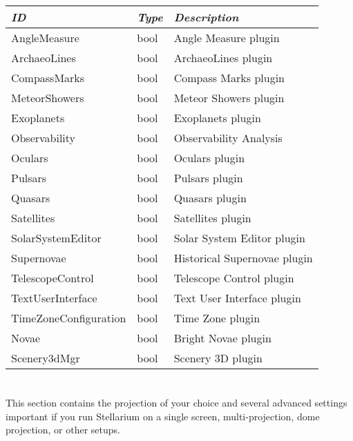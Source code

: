 \begin{longtabu} to \textwidth {l|l|X}
\toprule
\emph{ID} & \emph{Type} & \emph{Description}\\\midrule
AngleMeasure          & bool & Angle Measure plugin\\\midrule
ArchaeoLines          & bool & ArchaeoLines plugin\\\midrule
CompassMarks          & bool & Compass Marks plugin\\\midrule
MeteorShowers         & bool & Meteor Showers plugin \\\midrule
Exoplanets            & bool & Exoplanets plugin \\\midrule
Observability         & bool & Observability Analysis\\\midrule
Oculars               & bool & Oculars plugin \\\midrule
Pulsars               & bool & Pulsars plugin \\\midrule
Quasars               & bool & Quasars plugin \\\midrule
Satellites            & bool & Satellites plugin \\\midrule
SolarSystemEditor     & bool & Solar System Editor plugin\\\midrule
Supernovae            & bool & Historical Supernovae plugin \\\midrule
TelescopeControl      & bool & Telescope Control plugin \\\midrule
TextUserInterface     & bool & Text User Interface plugin \\\midrule
TimeZoneConfiguration & bool & Time Zone plugin \\\midrule
Novae                 & bool & Bright Novae plugin \\\midrule
Scenery3dMgr          & bool & Scenery 3D plugin \\\bottomrule
\end{longtabu}

\section{}\label{sec:config.ini:projection}

This section contains the projection of your choice and several
advanced settings important if you run Stellarium on a single screen,
multi-projection, dome projection, or other setups.

